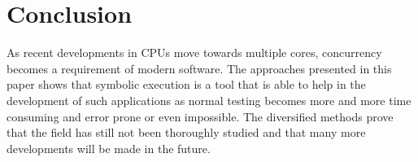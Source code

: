 \documentclass[10pt]{llncs}
\begin{document}
\section{Conclusion}
\label{conclusion}

As recent developments in CPUs move towards multiple cores, concurrency becomes a requirement of modern software. The approaches presented in this paper shows that symbolic execution is a tool that is able to help in the development of such applications as normal testing becomes more and more time consuming and error prone or even impossible. The diversified methods prove that the field has still not been thoroughly studied and that many more developments will be made in the future.



\end{document}
